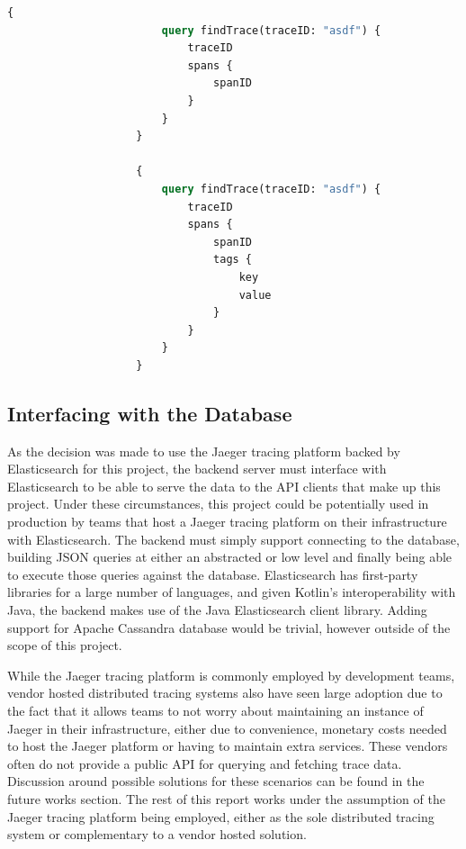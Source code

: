 \documentclass[12pt,pdftex,titlepage]{report}
\begin{document}
                \bigskip
                \begin{lstlisting}[caption={GraphQL query to fetch a trace object and the span ID of each of its spans vs a query to fetch the trace object, its spans and every
                    tag of every span.}, label={lst:graphTrace}, language=GraphQL, gobble=20]
                    {
                        query findTrace(traceID: "asdf") {
                            traceID
                            spans {
                                spanID
                            }
                        }
                    }

                    {
                        query findTrace(traceID: "asdf") {
                            traceID
                            spans {
                                spanID
                                tags {
                                    key
                                    value
                                }
                            }
                        }
                    }
                \end{lstlisting}

            \subsection{Interfacing with the Database}
                As the decision was made to use the Jaeger tracing platform backed by Elasticsearch for this project, the backend server must interface with Elasticsearch
                to be able to serve the data to the API clients that make up this project. Under these circumstances, this project could be potentially used in production
                by teams that host a Jaeger tracing platform on their infrastructure with Elasticsearch. The backend must simply support connecting to the database, building 
                JSON queries at either an abstracted or low level and finally being able to execute those queries against the database. Elasticsearch has first-party libraries
                for a  large number of languages, and given Kotlin's interoperability with Java, the backend makes use of the Java Elasticsearch client library. Adding support 
                for Apache Cassandra database would be trivial, however outside of the scope of this project.

                While the Jaeger tracing platform is commonly employed by development teams, vendor hosted distributed tracing systems also have seen large adoption due to the 
                fact that it allows teams to not worry about maintaining an instance of Jaeger in their infrastructure, either due to convenience, monetary costs needed to host
                the Jaeger platform or having to maintain extra services. These vendors often do not provide a public API for querying and fetching trace data. Discussion around
                possible solutions for these scenarios can be found in the future works section. The rest of this report works under the assumption of the Jaeger tracing platform
                being employed, either as the sole distributed tracing system or complementary to a vendor hosted solution. 
\end{document}
